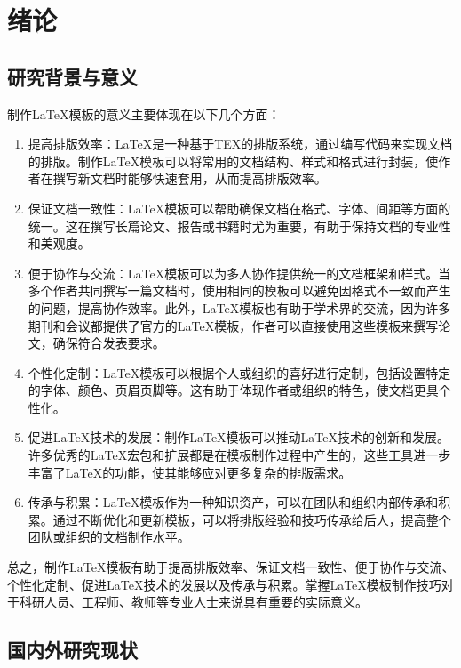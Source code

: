 \cleardoublepage

\chapter{绪论}

\section{研究背景与意义}

制作LaTeX模板的意义主要体现在以下几个方面：

\begin{enumerate}[fullwidth,itemindent=\parindent]
    \item 提高排版效率：LaTeX是一种基于TEX的排版系统，通过编写代码来实现文档的排版。制作LaTeX模板可以将常用的文档结构、样式和格式进行封装，使作者在撰写新文档时能够快速套用，从而提高排版效率。
    \item 保证文档一致性：LaTeX模板可以帮助确保文档在格式、字体、间距等方面的统一。这在撰写长篇论文、报告或书籍时尤为重要，有助于保持文档的专业性和美观度。
    \item 便于协作与交流：LaTeX模板可以为多人协作提供统一的文档框架和样式。当多个作者共同撰写一篇文档时，使用相同的模板可以避免因格式不一致而产生的问题，提高协作效率。此外，LaTeX模板也有助于学术界的交流，因为许多期刊和会议都提供了官方的LaTeX模板，作者可以直接使用这些模板来撰写论文，确保符合发表要求。
    \item 个性化定制：LaTeX模板可以根据个人或组织的喜好进行定制，包括设置特定的字体、颜色、页眉页脚等。这有助于体现作者或组织的特色，使文档更具个性化。
    \item 促进LaTeX技术的发展：制作LaTeX模板可以推动LaTeX技术的创新和发展。许多优秀的LaTeX宏包和扩展都是在模板制作过程中产生的，这些工具进一步丰富了LaTeX的功能，使其能够应对更多复杂的排版需求。
    \item 传承与积累：LaTeX模板作为一种知识资产，可以在团队和组织内部传承和积累。通过不断优化和更新模板，可以将排版经验和技巧传承给后人，提高整个团队或组织的文档制作水平。
\end{enumerate}

总之，制作LaTeX模板有助于提高排版效率、保证文档一致性、便于协作与交流、个性化定制、促进LaTeX技术的发展以及传承与积累。掌握LaTeX模板制作技巧对于科研人员、工程师、教师等专业人士来说具有重要的实际意义。

\section{国内外研究现状}


